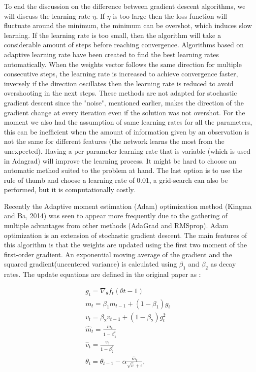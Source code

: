 \documentclass[a4paper,12pt]{article}
\numberwithin{equation}{section}
\begin{document}
To end the discussion on the difference between gradient descent algorithms, we will discuss the learning rate $\eta$. If $\eta$ is too large then the loss function will fluctuate around the minimum, the minimum can be overshot, which induces slow learning. If the learning rate is too small, then the algorithm will take a considerable amount of steps before reaching convergence. Algorithms based on adaptive learning rate have been created to find the best learning rates automatically. When the weights vector follows the same direction for multiple consecutive steps, the learning rate is increased to achieve convergence faster, inversely if the direction oscillates then the learning rate is reduced to avoid overshooting in the next steps. These methods are not adapted for stochastic gradient descent since the "noise", mentioned earlier, makes the direction of the gradient change at every iteration even if the solution was not overshot. For the moment we also had the assumption of same learning rates for all the parameters, this can be inefficient when the amount of information given by an observation is not the same for different features (the network learns the most from the unexpected). Having a per-parameter learning rate that is variable (which is used in Adagrad) will improve the learning process. It might be hard to choose an automatic method suited to the problem at hand. The last option is to use the rule of thumb and choose a learning rate of 0.01, a grid-search can also be performed, but it is computationally costly. \par

Recently the Adaptive moment estimation (Adam) optimization method (Kingma and Ba, 2014) was seen to appear more frequently due to the gathering of multiple advantages from other methods (AdaGrad and RMSprop). Adam optimization is an extension of stochastic gradient descent. The main features of this algorithm is that the weights are updated using the first two moment of the first-order gradient. An exponential moving average of the gradient and the squared gradient(uncentered variance) is calculated using $\beta_1$ and $\beta_2$ as decay rates. The update equations are defined in the original paper as :

\begin{align*}
g_t = \nabla_{\theta}f_t(\theta{t-1}) \\
m_t = \beta_1m_{t-1} + (1-\beta_1)g_t \\
v_t = \beta_2v_{t-1} + (1-\beta_2)g_t^2 \\
\hat{m}_t = \frac{m_t}{1-\beta_1^t} \\
\hat{v}_t = \frac{v_t}{1-\beta_2^t} \\
\theta_t = \theta_{t-1} - \alpha\frac{\hat{m}_t}{\sqrt{\hat{v}}+\epsilon}, 
\end{align*}
\end{document}
